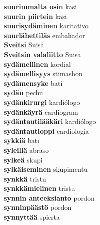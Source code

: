 \textbf{ suurimmalta osin  } kasi \\
\textbf{ suurin piirtein  } kasi \\
\textbf{ suurisydäminen  } karitativo \\
\textbf{ suurlähettiläs  } embahador \\
\textbf{ Sveitsi  } Suisa \\
\textbf{ Sveitsin valaliitto  } Suisa \\
\textbf{ sydämellinen  } kordial \\
\textbf{ sydämellisyys  } stimashon \\
\textbf{ sydämensyke  } bati \\
\textbf{ sydän  } pechu \\
\textbf{ sydänkirurgi  } kardiólogo \\
\textbf{ sydänkäyrä  } cardiogram \\
\textbf{ sydäntautilääkäri  } kardiólogo \\
\textbf{ sydäntautioppi  } cardiologia \\
\textbf{ sykkiä  } bati \\
\textbf{ syleillä  } abraso \\
\textbf{ sylkeä  } skupi \\
\textbf{ sylkäiseminen  } skupimentu \\
\textbf{ synkkä  } tristu \\
\textbf{ synkkämielinen  } tristu \\
\textbf{ synnin anteeksianto  } pordon \\
\textbf{ synninpäästö  } pordon \\
\textbf{ synnyttää  } spierta \\
